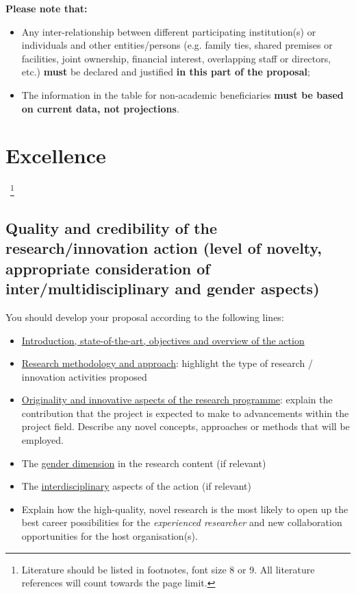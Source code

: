 \noindent
{\bf Please note that:}
\begin{itemize}
  \item Any inter-relationship between different participating institution(s) or individuals and other entities/persons (e.g. family ties, shared premises or facilities, joint ownership, financial interest, overlapping staff or directors, etc.) \textbf{must} be declared and justified \textbf{in this part of the proposal};
  \item The information in the table for non-academic beneficiaries \textbf{must be based on current data, not projections}.
\end{itemize}


\newpage
\markStartPageLimit
\section{Excellence}
\label{sec:excellence}
~\footnote{Literature should be listed in footnotes, font size 8 or 9.
All literature references will count towards the page limit.}

\subsection{Quality and credibility of the research/innovation action (level of novelty, appropriate consideration of inter/multidisciplinary and gender aspects)}
\label{sec:excellence_quality}

You should develop your proposal according to the following lines:
\begin{itemize}
  \item \ul{Introduction, state-of-the-art, objectives and overview of the action}
  \item \ul{Research methodology and approach}: highlight the type of research / innovation activities proposed
  \item \ul{Originality and innovative aspects of the research programme}: explain the contribution that the project is expected to make to advancements within the project field. Describe any novel concepts, approaches or methods that will be employed.
 \item The \ul{gender dimension} in the research content (if relevant)
 \item The \ul{interdisciplinary} aspects of the action (if relevant)
 \item Explain how the high-quality, novel research is the most likely to open up the best career possibilities for the {\em experienced researcher} and new collaboration opportunities for the host organisation(s). 
\end{itemize}




